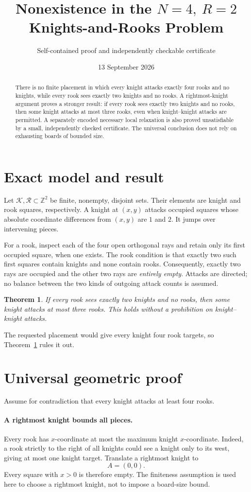 \documentclass[11pt]{article}
\title{\vspace{-1em}Nonexistence in the \(N=4,\ R=2\)\\Knights-and-Rooks Problem}
\author{Self-contained proof and independently checkable certificate}
\date{13 September 2026}
\newtheorem{theorem}{Theorem}
\newcommand{\Z}{\mathbb Z}
\newcommand{\Kset}{\mathcal K}
\newcommand{\Rset}{\mathcal R}
\begin{document}
\maketitle
\thispagestyle{fancy}
\begin{abstract}
There is no finite placement in which every knight attacks exactly four
rooks and no knights, while every rook sees exactly two knights and no
rooks. A rightmost-knight argument proves a stronger result: if every
rook sees exactly two knights and no rooks, then some knight attacks at
most three rooks, even when knight--knight attacks are permitted. A
separately encoded necessary local relaxation is also proved
unsatisfiable by a small, independently checked certificate. The universal
conclusion does not rely on exhausting boards of bounded size.
\end{abstract}

\section{Exact model and result}
Let \(\Kset,\Rset\subset\Z^2\) be finite, nonempty, disjoint sets. Their elements
are knight and rook squares, respectively. A knight at \((x,y)\) attacks
occupied squares whose absolute coordinate differences from \((x,y)\)
are \(1\) and \(2\). It jumps over intervening pieces.

For a rook, inspect each of the four open orthogonal rays and retain only
its first occupied square, when one exists. The rook condition is that
exactly two such first squares contain knights and none contain rooks.
Consequently, exactly two rays are occupied and the other two rays are
\emph{entirely empty}. Attacks are directed; no balance between the two
kinds of outgoing attack counts is assumed.

\begin{theorem}\label{thm:main}
If every rook sees exactly two knights and no rooks, then some knight
attacks at most three rooks. This holds without a prohibition on
knight--knight attacks.
\end{theorem}
The requested placement would give every knight four rook targets, so
Theorem~\ref{thm:main} rules it out.

\section{Universal geometric proof}
Assume for contradiction that every knight attacks at least four rooks.

\paragraph{A rightmost knight bounds all pieces.}
Every rook has \(x\)-coordinate at most the maximum knight \(x\)-coordinate.
Indeed, a rook strictly to the right of all knights could see a knight
only to its west, giving at most one knight target. Translate a rightmost
knight to
\[
A=(0,0).
\]
Every square with \(x>0\) is therefore empty. The finiteness assumption is
used here to choose a rightmost knight, not to impose a board-size bound.
\end{document}
